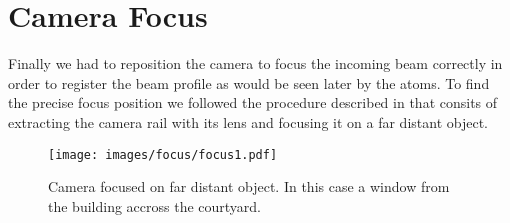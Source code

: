\section{Camera Focus}

Finally we had to reposition the camera to focus the incoming beam correctly
in order to register the beam profile as would be seen later by the atoms.
To find the precise focus position we followed the procedure described in
\cite{Hertlein2017} that consits of extracting the camera rail with its lens
and focusing it on a far distant object.

\begin{figure}[ht]
  \centering
  \texttt{[image: images/focus/focus1.pdf]}
  \caption{Camera focused on far distant object. In this case a window from the
  building accross the courtyard.}
\end{figure}
